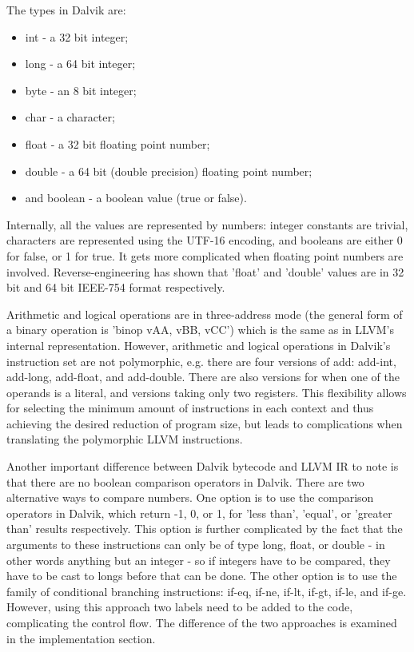 \documentclass[parskip]{cs4rep}
\begin{document}
The types in Dalvik are:
\begin{itemize}
\item int - a 32 bit integer;
\item long - a 64 bit integer;
\item byte - an 8 bit integer;
\item char - a character;
\item float - a 32 bit floating point number;
\item double - a 64 bit (double precision) floating point number;
\item and boolean - a boolean value (true or false).
\end{itemize}
Internally, all the values are represented by numbers: integer constants are trivial, characters are represented using the UTF-16 encoding, and booleans are either 0 for false, or 1 for true. It gets more complicated when floating point numbers are involved. Reverse-engineering has shown that 'float' and 'double' values are in 32 bit and 64 bit IEEE-754 format respectively.

Arithmetic and logical operations are in three-address mode\cite{TheAndroidOpenSourceProject2007} (the general form of a binary operation is 'binop vAA, vBB, vCC') which is the same as in LLVM's internal representation. However, arithmetic and logical operations in Dalvik's instruction set are not polymorphic, e.g. there are four versions of add: add-int, add-long, add-float, and add-double. There are also versions for when one of the operands is a literal, and versions taking only two registers. This flexibility allows for selecting the minimum amount of instructions in each context and thus achieving the desired reduction of program size, but leads to complications when translating the polymorphic LLVM instructions.

Another important difference between Dalvik bytecode and LLVM IR to note is that there are no boolean comparison operators in Dalvik. There are two alternative ways to compare numbers. One option is to use the comparison operators in Dalvik, which return -1, 0, or 1, for 'less than', 'equal', or 'greater than' results respectively. This option is further complicated by the fact that the arguments to these instructions can only be of type long, float, or double - in other words anything but an integer - so if integers have to be compared, they have to be cast to longs before that can be done. The other option is to use the family of conditional branching instructions: if-eq, if-ne, if-lt, if-gt, if-le, and if-ge. However, using this approach two labels need to be added to the code, complicating the control flow. The difference of the two approaches is examined in the implementation section.
\end{document}
